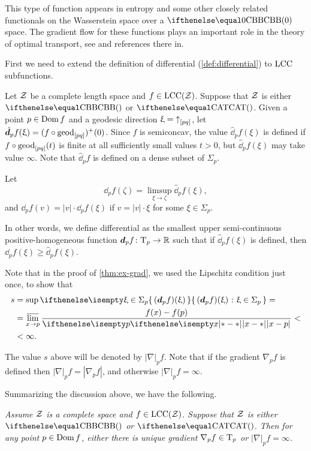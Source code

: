 This type of function appears in
entropy and some other closely related functionals on the Wasserstein space over a  $\Alex0$ space.
The gradient flow for these functions plays an important role in the theory of optimal transport, see \cite{villani} and references there in. 


First we need to extend the definition of differential (\ref{def:differential}) to $\mathrm{LCC}$ subfunctions.

Let $\mathcal{Z}$ be a complete length space and $f\in\LSCSC(\spc{Z})$.
Suppose that $\mathcal{Z}$ is either $\Alex{}$ or $\CAT{}$.
Given a point $p\in \Dom f$ and a geodesic direction $\upxi={\uparrow}_{[{p}{q}]}$, 
let 
$\hat \dd_pf(\xi)=(f\circ\geod_{[pq]})^+(0)$.
Since $f$ is semiconcav, the value $\hat \dd_pf(\xi)$ is defined if $f\circ\geod_{[pq]}(t)$ is finite at all sufficiently small values $t>0$,
but $\hat \dd_pf(\xi)$ may take value $\infty$. 
Note that $\hat \dd_pf$ is defined on a dense subset of $\Sigma_p$.

Let 
\[\dd_pf(\zeta)=\limsup_{\xi\to\zeta}\hat\dd_pf(\xi),\]
and $\dd_pf(v)=|v|\cdot \dd_pf(\xi)$ if $v=|v|\cdot\xi$ for some $\xi\in\Sigma_p$.

In other words, we define differential as the smallest 
upper semi-continuous  positive-homogeneous function $\dd_pf\:\T_p\to\RR$
such that if $\hat\dd_pf(\xi)$ is defined, then $\dd_pf(\xi)\ge \hat \dd_pf(\xi)$.



Note that in the proof of \ref{thm:ex-grad}, 
we used the Lipschitz condition just once,
to show that 
\begin{align*}
s&=\sup\set{(\dd_p f)(\xi)}{\xi\in\Sigma_p}=
\\
&=\limsup_{x\to p}\frac{f(x)-f(p)}{\dist{x}{p}{}}<
\\
&<\infty.
\end{align*}


The value $s$ above will be denoted by $|\nabla|_pf$.
Note that 
if the gradient $\nabla_pf$ is defined then $|\nabla|_pf=|\nabla_pf|$,
and otherwise $|\nabla|_pf=\infty$.

Summarizing the discussion above, 
we have the following.

\textit{Assume $\mathcal{Z}$ is a complete space and $f\in \LSCSC(\spc{Z})$. 
Suppose that $\mathcal{Z}$ is either $\Alex{}$ or $\CAT{}$.
Then for any point $p\in \Dom f$, either there is unique gradient $\nabla_p f\in \T_p$ 
or $|\nabla|_pf=\infty$.}

